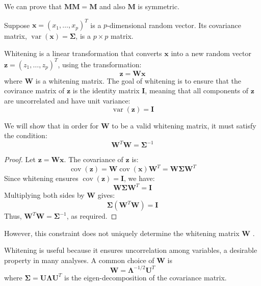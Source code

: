 \documentclass[12pt]{article}
\begin{document}
We can prove that \( \mathbf{MM} = \mathbf{M} \) and also \( \mathbf{M} \) is symmetric.


Suppose \( \mathbf{x}=\left(x_1, \ldots, x_p\right)^T \) is a \( p \)-dimensional random vector. Its covariance matrix, \( \operatorname{var} (\mathbf{x}) = \boldsymbol{\Sigma} \), is a  \( p \times p \) matrix.

Whitening is a linear transformation that converts \( \mathbf{x} \) into a new random vector \( \mathbf{z}=\left(z_1, \ldots, z_p\right)^T \), using the transformation:
\[
  \mathbf{z}=\mathbf{W} \mathbf{x}
\]
where \( \mathbf{W} \) is a whitening matrix. The goal of whitening is to ensure that the covirance matrix of \( \mathbf{z} \) is the identity matrix \( \mathbf{I} \), meaning that all components of \( \mathbf{z} \) are uncorrelated and have unit variance:
\[
  \operatorname{var}(\mathbf{z})=\mathbf{I}
\]

We will show that in order for \( \mathbf{W} \) to be a valid whitening matrix, it must satisfy the condition:
\[
  \mathbf{W}^T \mathbf{W}=\boldsymbol{\Sigma}^{-1}
\]

\begin{proof}
  Let \( \mathbf{z} = \mathbf{W} \mathbf{x} \). The covariance of \( \mathbf{z} \) is:
  \[
    \operatorname{cov}(\mathbf{z}) = \mathbf{W} \operatorname{cov}(\mathbf{x}) \mathbf{W}^T = \mathbf{W} \boldsymbol{\Sigma} \mathbf{W}^T
  \]
  Since whitening ensures \( \operatorname{cov}(\mathbf{z}) = \mathbf{I} \), we have:
  \[
    \mathbf{W} \boldsymbol{\Sigma} \mathbf{W}^T = \mathbf{I}
  \]
  Multiplying both sides by \( \mathbf{W} \) gives:
  \[
    \boldsymbol{\Sigma} (\mathbf{W}^T \mathbf{W}) = \mathbf{I}
  \]
  Thus, \( \mathbf{W}^T \mathbf{W} = \boldsymbol{\Sigma}^{-1} \), as required.
\end{proof}

However, this constraint does not uniquely determine the whitening matrix \( \mathbf{W} \) \cite{Kessy_Lewin_Strimmer_2018}.

Whitening is useful because it ensures uncorrelation among variables, a desirable property in many analyses. A common choice of \( \mathbf{W} \) is
\[
  \mathbf{W}=\boldsymbol{\Lambda}^{-1 / 2} \mathbf{U}^T
\]
where \( \boldsymbol{\Sigma}=\mathbf{U} \boldsymbol{\Lambda} \mathbf{U}^T \) is the eigen-decomposition of the covariance matrix. 
\end{document}
